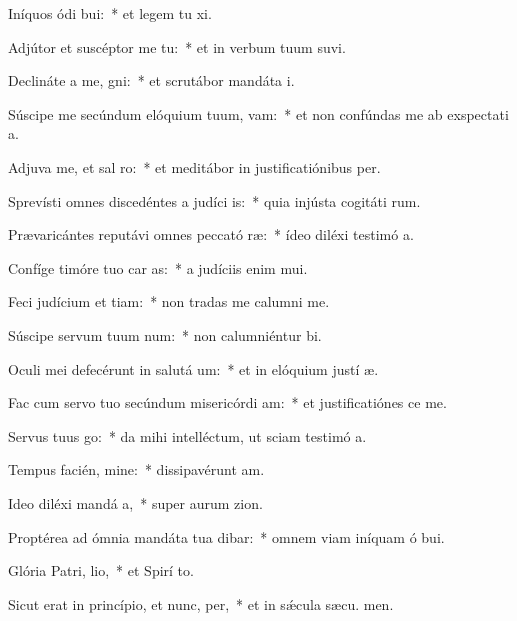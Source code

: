 \item Iníquos ódi bui:~* et legem tu xi.
\item Adjútor et suscéptor me  tu:~* et in verbum tuum suvi.
\item Declináte a me, gni:~* et scrutábor mandáta  i.
\item Súscipe me secúndum elóquium tuum,  vam:~* et non confúndas me ab exspectati a.
\item Adjuva me, et sal ro:~* et meditábor in justificatiónibus  per.
\item Sprevísti omnes discedéntes a judíci is:~* quia injústa cogitáti rum.
\item Prævaricántes reputávi omnes peccató ræ:~* ídeo diléxi testimó a.
\item Confíge timóre tuo car as:~* a judíciis enim  mui.
\item Feci judícium et tiam:~* non tradas me calumni me.
\item Súscipe servum tuum  num:~* non calumniéntur  bi.
\item Oculi mei defecérunt in salutá um:~* et in elóquium justí æ.
\item Fac cum servo tuo secúndum misericórdi am:~* et justificatiónes  ce me.
\item Servus tuus  go:~* da mihi intelléctum, ut sciam testimó a.
\item Tempus facién, mine:~* dissipavérunt  am.
\item Ideo diléxi mandá a,~* super aurum  zion.
\item Proptérea ad ómnia mandáta tua dibar:~* omnem viam iníquam ó bui.
\item Glória Patri,  lio,~* et Spirí to.
\item Sicut erat in princípio, et nunc,  per,~* et in sǽcula sæcu. men.
